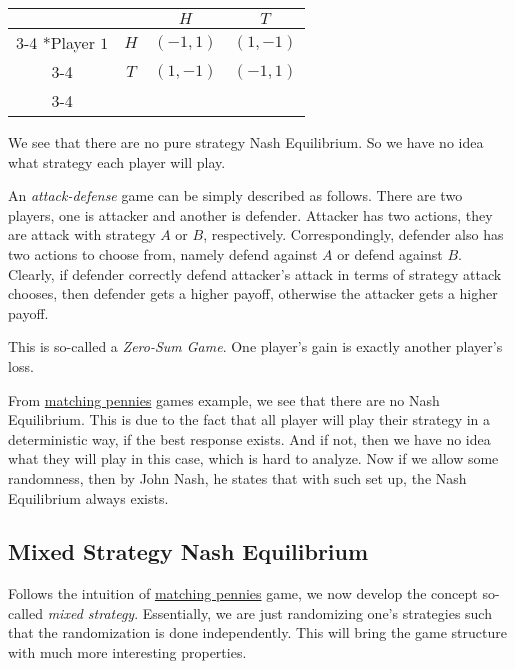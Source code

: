 \begin{eg}
\begin{enumerate}
\begin{table}[H]
\begin{tabular}{cc|c|c|}
				                                & \multicolumn{1}{c}{} & \multicolumn{1}{c}{$H$}        & \multicolumn{1}{c}{$T$} \\\cline{3-4}
				      \multirow{2}*{Player $1$} & $H$                  & $(-1, 1)$                      & $(1, -1)$               \\\cline{3-4}
				                                & $T$                  & $(1, -1)$                      & $(-1, 1)$               \\\cline{3-4}
			      \end{tabular}
		      \end{table}
		      We see that there are no pure strategy Nash Equilibrium. So we have no idea what strategy each player will play.
		      \begin{note}
			      An \emph{attack-defense} game can be simply described as follows. There are two players, one is attacker and another is defender. Attacker has two actions,
			      they are attack with strategy \(A\) or \(B\), respectively. Correspondingly, defender also has two actions to choose from, namely defend against \(A\)
			      or defend against \(B\). Clearly, if defender correctly defend attacker's attack in terms of strategy attack chooses, then defender gets a higher payoff,
			      otherwise the attacker gets a higher payoff.
		      \end{note}
		      \begin{remark}
			      This is so-called a \emph{Zero-Sum Game}. One player's gain is exactly another player's loss.
		      \end{remark}
	\end{enumerate}
\end{eg}

\begin{remark}
	From \hyperref[matching-pennies]{matching pennies} games example, we see that there are no Nash Equilibrium. This is due to the fact that all player will play
	their strategy in a deterministic way, if the best response exists. And if not, then we have no idea what they will play in this case, which is hard to analyze.
	Now if we allow some randomness, then by John Nash, he states that with such set up, the Nash Equilibrium always exists.
\end{remark}

\subsection{Mixed Strategy Nash Equilibrium}
Follows the intuition of \hyperref[matching-pennies]{matching pennies} game, we now develop the concept so-called \emph{mixed strategy}. Essentially, we are just
randomizing one's strategies such that the randomization is done independently. This will bring the game structure with much more interesting properties.


